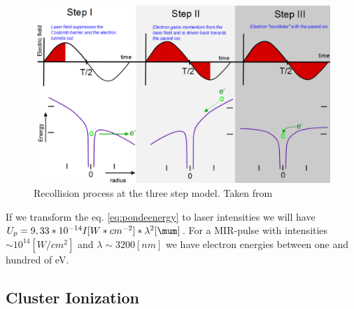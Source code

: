 \begin{figure}[hbtp]
\centering
\includegraphics[width=12 cm]{../Images/ponderomotive steps.png}
\caption[Ponderomotive 3 steps]{Recollision  process at the three step model. Taken from \cite{krishnan_doped_2011}}
\end{figure}


If we transform the eq. \ref{eq:pondeenergy} to laser intensities we will have $U_{p} = 9,33*10^{-14}I[W*cm^{-2}] * \lambda^{2}[\mum]$. For a MIR-pulse with intensities $\sim 10^{14} [W/cm^{2}]$ and $\lambda \sim 3200 [nm]$ we have electron energies between one and hundred of eV.

\subsection{Cluster Ionization}

